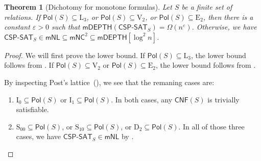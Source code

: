 \documentclass[10pt,a4paper]{article}
\newtheorem{theorem}{Theorem}[section]
\newcommand{\eps}{\varepsilon}
\newcommand{\complexityfont}[1]{\mathsf{#1}}
\newcommand{\monclass}[1]{\mathsf{m}#1}
\def\mNC          {\monclass{\NC}}
\newcommand\NL           {\complexityfont{NL}}
\def\mNL          {\monclass{\NL}}
\def\NC           {\complexityfont{NC}}
\def\DEPTH        {\complexityfont{DEPTH}}
\def\mDEPTH       {\monclass{\DEPTH}}
\newcommand{\CNF}{\mathsf{CNF}}
\newcommand{\mdepth}[1]{\mathsf{mDEPTH}({#1})}
\def\sseq{\subseteq}
\newcommand{\CSPf}[1]{\mathsf{CSP}\text{-}\mathsf{SAT}_{#1}}
\newcommand{\Pol}{\mathsf{Pol}}
\newcommand{\clonefont}[1]{\mathrm{#1}}
\begin{document}
\begin{theorem}[Dichotomy for monotone formulas]
    \label{thm:monfml-dichotomy}
    Let $S$ be a finite set of relations.
    If 
    $\Pol(S) \sseq \clonefont{L_3}$, or
    $\Pol(S) \sseq \clonefont{V_2}$, or
    $\Pol(S) \sseq \clonefont{E_2}$,
    then there 
    is
    a constant $\eps > 0$
    such that
    $\mdepth{\CSPf{S}} = {\Omega(n^\eps)}$.
    Otherwise, 
    we have
    $\CSPf{S} \in \mNL
    \sseq \mNC^2 \sseq \mDEPTH[\log^2 n]$.
\end{theorem}
\begin{proof}
    We will first prove the lower bound.
    If $\Pol(S) \sseq \clonefont{L_3}$, the lower bound follows
    from .
    If
    $\Pol(S) \sseq \clonefont{V_2}$ or
    $\Pol(S) \sseq \clonefont{E_2}$,
    the lower bound follows 
    from .
    
    By inspecting Post's 
    lattice~(),
    we see that
    the remaning cases are:
    \begin{enumerate}
        \item $\clonefont{I_0} \sseq \Pol(S)$ or $\clonefont{I_1} \sseq \Pol(S)$.
            In both cases, any $\CNF(S)$ is trivially satisfiable.
        \item 
            $\clonefont{S_{00}} \sseq \Pol(S)$,
            or
            $\clonefont{S_{10}} \sseq \Pol(S)$,
            or
            $\clonefont{D_2} \sseq \Pol(S)$.
            In all of those three cases, we have
            $\CSPf{S} \in \mNL$ by
            .
            \qedhere
    \end{enumerate}
\end{proof}
\end{document}
